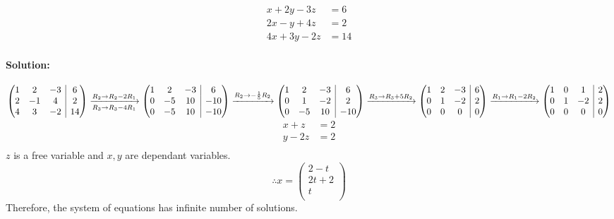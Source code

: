 \documentclass[fleqn]{article}
\makeatletter
\newenvironment{amatrix}[1]{%
	\left(\begin{array}{@{}*{#1}{c}|c@{}}
}{%
	\end{array}\right)
}
\makeatother
\begin{document}
\subsubsection{}

\begin{align*}
x + 2y - 3z &= 6\\
2x - y + 4z &= 2\\
4x + 3y - 2z &= 14
\end{align*}

\paragraph*{Solution:\\}

$
\begin{amatrix}{3}
	1 & 2 & -3 & 6 \\
	2 & -1 & 4 & 2\\
	4 & 3 & -2 & 14\\
\end{amatrix}
\xrightarrow[R_3 \rightarrow R_3 - 4 R_1]{R_2 \rightarrow R_2 - 2 R_1}
\begin{amatrix}{3}
	1 & 2 & -3 & 6\\
	0 & -5 & 10 & -10\\
	0 & -5 & 10 & -10\\
\end{amatrix}
\xrightarrow{R_2 \rightarrow -\frac{1}{5} R_2}
\begin{amatrix}{3}
	1 & 2 & -3 & 6\\
	0 & 1 & -2 & 2\\
	0 & -5 & 10 & -10\\
\end{amatrix}
\xrightarrow{R_3 \rightarrow R_3 + 5 R_2}
\begin{amatrix}{3}
	1 & 2 & -3 & 6\\
	0 & 1 & -2 & 2\\
	0 & 0 & 0 & 0 \\
\end{amatrix}
\xrightarrow{R_1 \rightarrow R_1 - 2 R_2}
\begin{amatrix}{3}
	1 & 0 & 1 & 2\\
	0 & 1 & -2 & 2\\
	0 & 0 & 0 & 0\\
\end{amatrix}
$
\begin{align*}
x + z &= 2\\
y - 2z &=2\\
\end{align*}
$z$ is a free variable and $x,y$ are dependant variables.
\begin{equation*}
\therefore x = 
\begin{pmatrix}
	2 - t\\
	2t + 2\\
	t\\
\end{pmatrix}
\end{equation*}
Therefore, the system of equations has infinite number of solutions.
\end{document}

